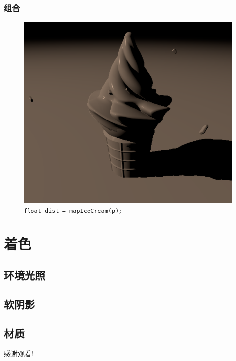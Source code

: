 \documentclass[aspectratio=169]{ctexbeamer} %
\begin{document}
\begin{frame}
    \frametitle{组合}
    \begin{figure}[htbp]
        \centering
        \includegraphics[height=.75\textheight]{images/pre/icecream_model.pdf}
        \caption{\texttt{float dist = mapIceCream(p);}}
        \label{fig:icecream_model}
    \end{figure}
\end{frame}

\section{着色}
\subsection{环境光照}
\subsection{软阴影}
\subsection{材质}

\begin{frame}
    \begin{center}
        \Huge{感谢观看!}
    \end{center}
\end{frame}
\end{document}
